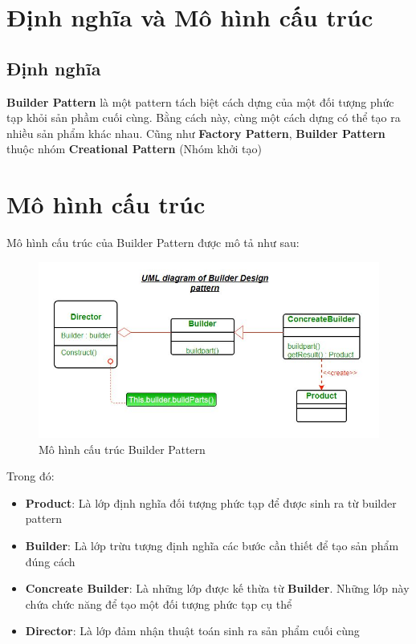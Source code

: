 \section{Định nghĩa và Mô hình cấu trúc}
\subsection{Định nghĩa}
\textbf{Builder Pattern} là một pattern tách biệt cách dựng của một đối tượng phức tạp khỏi sản phầm cuối cùng. Bằng cách này, cùng một cách dựng có thể tạo ra nhiều sản phẩm khác nhau. Cũng như \textbf{Factory Pattern}, \textbf{Builder Pattern} thuộc nhóm \textbf{Creational Pattern} (Nhóm khởi tạo)
\section{Mô hình cấu trúc}
Mô hình cấu trúc của Builder Pattern được mô tả như sau:
\begin{figure}[!htb]
    \centering
    \includegraphics[width=\textwidth]{fig/Builder/BuilderDiagram.png}
    \caption{Mô hình cấu trúc Builder Pattern}
\end{figure}
Trong đó:
\begin{itemize}
    \item \textbf{Product}: Là lớp định nghĩa đối tượng phức tạp để được sinh ra từ builder pattern
    \item \textbf{Builder}: Là lớp trừu tượng định nghĩa các bước cần thiết để tạo sản phẩm đúng cách
    \item \textbf{Concreate Builder}: Là những lớp được kế thừa từ \textbf{Builder}. Những lớp này chứa chức năng để tạo một đối tượng phức tạp cụ thể
    \item \textbf{Director}: Là lớp đảm nhận thuật toán sinh ra sản phẩm cuối cùng
\end{itemize}

